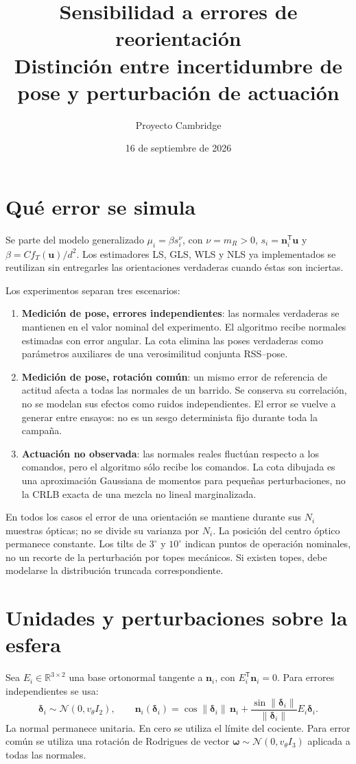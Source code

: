 \documentclass[11pt,a4paper]{article}
\title{Sensibilidad a errores de reorientación\\\large Distinción entre incertidumbre de pose y perturbación de actuación}
\author{Proyecto Cambridge}
\date{16 de septiembre de 2026}
\begin{document}
\maketitle

\section{Qué error se simula}
Se parte del modelo generalizado $\mu_i=\beta s_i^\nu$, con $\nu=m_R>0$, $s_i=\mathbf n_i^{\mathsf T}\mathbf u$ y $\beta=Cf_T(\mathbf u)/d^2$. Los estimadores LS, GLS, WLS y NLS ya implementados se reutilizan sin entregarles las orientaciones verdaderas cuando éstas son inciertas.

Los experimentos separan tres escenarios:
\begin{enumerate}
\item \textbf{Medición de pose, errores independientes}: las normales verdaderas se mantienen en el valor nominal del experimento. El algoritmo recibe normales estimadas con error angular. La cota elimina las poses verdaderas como parámetros auxiliares de una verosimilitud conjunta RSS--pose.
\item \textbf{Medición de pose, rotación común}: un mismo error de referencia de actitud afecta a todas las normales de un barrido. Se conserva su correlación, no se modelan sus efectos como ruidos independientes. El error se vuelve a generar entre ensayos: no es un sesgo determinista fijo durante toda la campaña.
\item \textbf{Actuación no observada}: las normales reales fluctúan respecto a los comandos, pero el algoritmo sólo recibe los comandos. La cota dibujada es una aproximación Gaussiana de momentos para pequeñas perturbaciones, no la CRLB exacta de una mezcla no lineal marginalizada.
\end{enumerate}
En todos los casos el error de una orientación se mantiene durante sus $N_i$ muestras ópticas; no se divide su varianza por $N_i$. La posición del centro óptico permanece constante. Los tilts de $3^\circ$ y $10^\circ$ indican puntos de operación nominales, no un recorte de la perturbación por topes mecánicos. Si existen topes, debe modelarse la distribución truncada correspondiente.

\section{Unidades y perturbaciones sobre la esfera}
Sea $E_i\in\mathbb R^{3\times2}$ una base ortonormal tangente a $\mathbf n_i$, con $E_i^{\mathsf T}\mathbf n_i=0$. Para errores independientes se usa:
\begin{equation}
 \boldsymbol\delta_i\sim\mathcal N(0,v_\theta I_2),\qquad
 \mathbf n_i(\boldsymbol\delta_i)=\cos\|\boldsymbol\delta_i\|\,\mathbf n_i+
 \frac{\sin\|\boldsymbol\delta_i\|}{\|\boldsymbol\delta_i\|}E_i\boldsymbol\delta_i.
\label{eq:perturb}
\end{equation}
La normal permanece unitaria. En cero se utiliza el límite del cociente. Para error común se utiliza una rotación de Rodrigues de vector $\boldsymbol\omega\sim\mathcal N(0,v_\theta I_3)$ aplicada a todas las normales.
\end{document}
